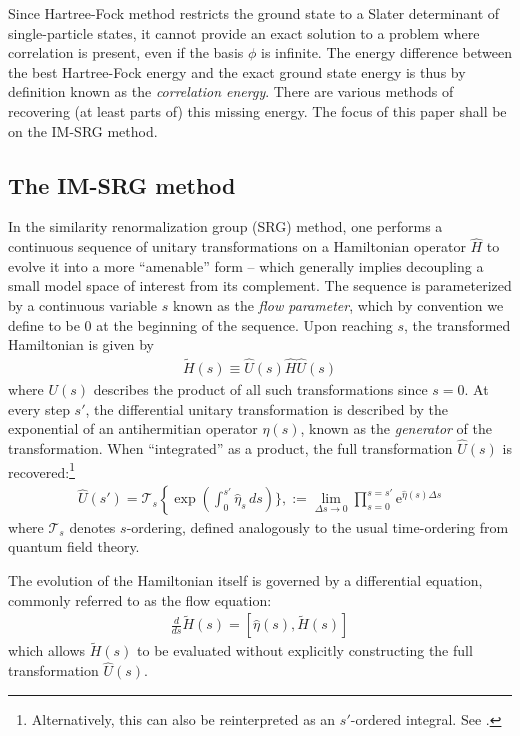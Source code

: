 \documentclass[amsmath, amssymb, aps, floatfix, nofootinbib, preprintnumbers,showpacs, superscriptaddress, twocolumn]{revtex4-1}
\begin{document}
Since Hartree-Fock method restricts the ground state to a Slater determinant
of single-particle states, it cannot provide an exact solution to a problem
where correlation is present, even if the basis $\phi$ is infinite.  The
energy difference between the best Hartree-Fock energy and the exact ground
state energy is thus by definition known as the \textit{correlation energy}.
There are various methods of recovering (at least parts of) this missing
energy.  The focus of this paper shall be on the IM-SRG method.

\subsection{The IM-SRG method}
\label{subsec:imsrgmethod}

In the similarity renormalization group (SRG) method, one performs a
continuous sequence of unitary transformations on a Hamiltonian operator
$\hat H$ to evolve it into a more ``amenable'' form -- which generally implies
decoupling a small model space of interest from its complement.  The sequence
is parameterized by a continuous variable $s$ known as the \textit{flow
  parameter}, which by convention we define to be $0$ at the beginning of the
sequence.  Upon reaching $s$, the transformed Hamiltonian is given by
\begin{align*}
  \tilde H(s) \equiv \hat U(s) \hat H \hat U(s)
\end{align*}
where $U(s)$ describes the product of all such transformations since $s = 0$.
At every step $s'$, the differential unitary transformation is described by
the exponential of an antihermitian operator $\eta(s)$, known as the
\textit{generator} of the transformation.  When ``integrated'' as a product,
the full transformation $\hat U(s)$ is recovered:\footnote{Alternatively, this
  can also be reinterpreted as an $s'$-ordered integral.  See \cite[\S
  6.1]{reimann2013quantum}.}
\begin{align*}
  \hat U(s')
  = \mathcal T_s \left\{ \exp \left(\int_0^{s'} \hat \eta_s \, d s \right)\},
  := \lim_{\Delta s \to 0} \prod_{s = 0}^{s = s'}
  \mathrm e^{\hat \eta(s) \Delta s}
\end{align*}
where $\mathcal T_s$ denotes $s$-ordering, defined analogously to the usual
time-ordering from quantum field theory.

The evolution of the Hamiltonian itself is governed by a differential
equation, commonly referred to as the flow equation:
\begin{gather} \label{eq:imsrgode}
  \frac{d}{d s} \tilde H(s) = [\hat \eta(s), \tilde H(s)]
\end{gather}
which allows $\tilde H(s)$ to be evaluated without explicitly constructing the
full transformation $\hat U(s)$.
\end{document}
